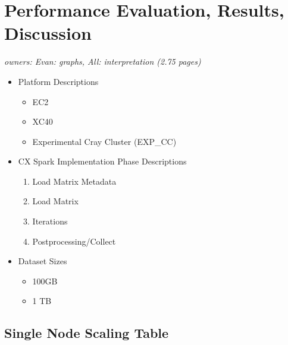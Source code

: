 \section{Performance Evaluation, Results, Discussion}

\textit{owners: Evan: graphs, All: interpretation (2.75 pages)}

\begin{itemize}
\item Platform Descriptions
\begin{itemize}
  \item EC2

  \item XC40
  \item Experimental Cray Cluster (EXP\_CC)
\end{itemize}

\item CX Spark Implementation Phase Descriptions
 \begin{enumerate}
      \item Load Matrix Metadata
      \item Load Matrix
      \item Iterations
      \item Postprocessing/Collect
 \end{enumerate}

 \item Dataset Sizes
 \begin{itemize}
  \item 100GB

  \item 1 TB

\end{itemize}
 \end{itemize}

  




  \subsection{Single Node Scaling Table}
  \label{sxn:results1}


   
  \vspace*{0.1in}

